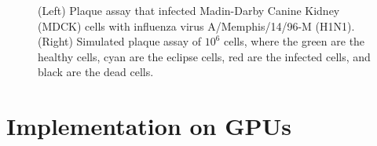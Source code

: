 \begin{figure}[h]
    \centering

\caption{(Left) Plaque assay that infected Madin-Darby Canine Kidney (MDCK) cells with influenza virus A/Memphis/14/96-M (H1N1). (Right) Simulated plaque assay of $10^{6}$ cells, where the green are the healthy cells, cyan are the eclipse cells, red are the infected cells, and black are the dead cells. \label{fig_Plaques}}
\end{figure}

\section{Implementation on GPUs}


